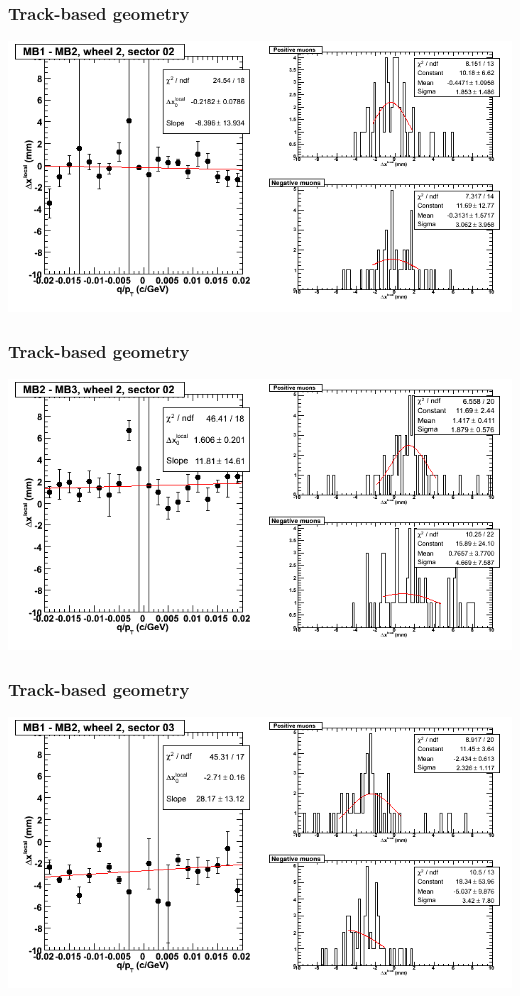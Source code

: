 \documentclass[compress]{beamer}
\begin{document}
\begin{frame}
\frametitle{Track-based geometry}
\includegraphics[width=\linewidth]{NOV4_segdiffs/dt13_resid_E_02_12.png}
\end{frame}

\begin{frame}
\frametitle{Track-based geometry}
\includegraphics[width=\linewidth]{NOV4_segdiffs/dt13_resid_E_02_23.png}
\end{frame}

\begin{frame}
\frametitle{Track-based geometry}
\includegraphics[width=\linewidth]{NOV4_segdiffs/dt13_resid_E_03_12.png}
\end{frame}
\end{document}
